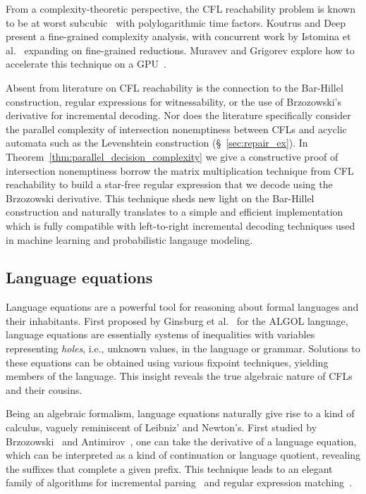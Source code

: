 \documentclass[sigplan,review,acmsmall,nonacm,screen,anonymous]{acmart}\settopmatter{printfolios=false,printccs=false,printacmref=false}
\begin{document}
From a complexity-theoretic perspective, the CFL reachability problem is known to be at worst subcubic~\cite{chistikov2022subcubic} with polylogarithmic time factors. Koutrus and Deep~\cite{koutris2023fine} present a fine-grained complexity analysis, with concurrent work by Istomina et al.~\cite{istomina2023fine} expanding on fine-grained reductions. Muravev and Grigorev explore how to accelerate this technique on a GPU~\cite{muravev2025universal}.

Absent from literature on CFL reachability is the connection to the Bar-Hillel construction, regular expressions for witnessability, or the use of Brzozowski's derivative for incremental decoding. Nor does the literature specifically consider the parallel complexity of intersection nonemptiness between CFLs and acyclic automata such as the Levenshtein construction (\S~\ref{sec:repair_ex}). In Theorem~\ref{thm:parallel_decision_complexity} we give a constructive proof of intersection nonemptiness borrow the matrix multiplication technique from CFL reachability to build a star-free regular expression that we decode using the Brzozowski derivative. This technique sheds new light on the Bar-Hillel construction and naturally translates to a simple and efficient implementation which is fully compatible with left-to-right incremental decoding techniques used in machine learning and probabilistic langauge modeling.

\subsection{Language equations}

Language equations are a powerful tool for reasoning about formal languages and their inhabitants. First proposed by Ginsburg et al.~\cite{ginsburg1962two} for the ALGOL language, language equations are essentially systems of inequalities with variables representing \textit{holes}, i.e., unknown values, in the language or grammar. Solutions to these equations can be obtained using various fixpoint techniques, yielding members of the language. This insight reveals the true algebraic nature of CFLs and their cousins.

Being an algebraic formalism, language equations naturally give rise to a kind of calculus, vaguely reminiscent of Leibniz' and Newton's. First studied by Brzozowski~\cite{brzozowski1964derivatives, brzozowski1980equations} and Antimirov~\cite{antimirov1996partial}, one can take the derivative of a language equation, which can be interpreted as a kind of continuation or language quotient, revealing the suffixes that complete a given prefix. This technique leads to an elegant family of algorithms for incremental parsing~\cite{might2011parsing, adams2016complexity} and regular expression matching~\cite{stanford2021symbolic,varatalu2025re}.
\end{document}
